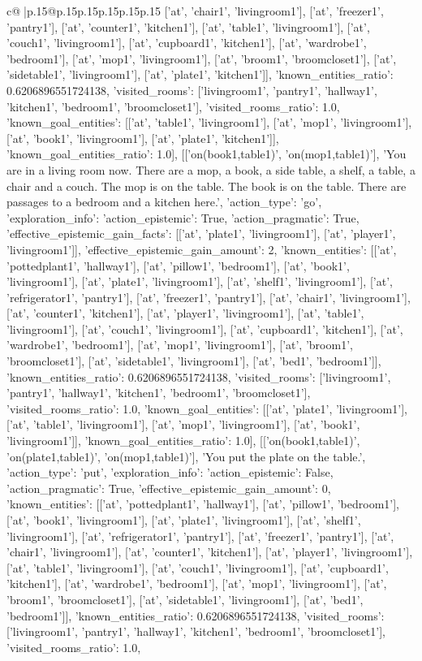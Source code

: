 \documentclass{article}
\begin{document}
{\begin{supertabular}{c@{$\;$}|p{.15\linewidth}@{}p{.15\linewidth}p{.15\linewidth}p{.15\linewidth}p{.15\linewidth}p{.15\linewidth}}
{{{['at', 'chair1', 'livingroom1'], ['at', 'freezer1', 'pantry1'], ['at', 'counter1', 'kitchen1'], ['at', 'table1', 'livingroom1'], ['at', 'couch1', 'livingroom1'], ['at', 'cupboard1', 'kitchen1'], ['at', 'wardrobe1', 'bedroom1'], ['at', 'mop1', 'livingroom1'], ['at', 'broom1', 'broomcloset1'], ['at', 'sidetable1', 'livingroom1'], ['at', 'plate1', 'kitchen1']], 'known_entities_ratio': 0.6206896551724138, 'visited_rooms': ['livingroom1', 'pantry1', 'hallway1', 'kitchen1', 'bedroom1', 'broomcloset1'], 'visited_rooms_ratio': 1.0, 'known_goal_entities': [['at', 'table1', 'livingroom1'], ['at', 'mop1', 'livingroom1'], ['at', 'book1', 'livingroom1'], ['at', 'plate1', 'kitchen1']], 'known_goal_entities_ratio': 1.0}}], [['on(book1,table1)', 'on(mop1,table1)'], 'You are in a living room now. There are a mop, a book, a side table, a shelf, a table, a chair and a couch. The mop is on the table. The book is on the table. There are passages to a bedroom and a kitchen here.', {'action_type': 'go', 'exploration_info': {'action_epistemic': True, 'action_pragmatic': True, 'effective_epistemic_gain_facts': [['at', 'plate1', 'livingroom1'], ['at', 'player1', 'livingroom1']], 'effective_epistemic_gain_amount': 2, 'known_entities': [['at', 'pottedplant1', 'hallway1'], ['at', 'pillow1', 'bedroom1'], ['at', 'book1', 'livingroom1'], ['at', 'plate1', 'livingroom1'], ['at', 'shelf1', 'livingroom1'], ['at', 'refrigerator1', 'pantry1'], ['at', 'freezer1', 'pantry1'], ['at', 'chair1', 'livingroom1'], ['at', 'counter1', 'kitchen1'], ['at', 'player1', 'livingroom1'], ['at', 'table1', 'livingroom1'], ['at', 'couch1', 'livingroom1'], ['at', 'cupboard1', 'kitchen1'], ['at', 'wardrobe1', 'bedroom1'], ['at', 'mop1', 'livingroom1'], ['at', 'broom1', 'broomcloset1'], ['at', 'sidetable1', 'livingroom1'], ['at', 'bed1', 'bedroom1']], 'known_entities_ratio': 0.6206896551724138, 'visited_rooms': ['livingroom1', 'pantry1', 'hallway1', 'kitchen1', 'bedroom1', 'broomcloset1'], 'visited_rooms_ratio': 1.0, 'known_goal_entities': [['at', 'plate1', 'livingroom1'], ['at', 'table1', 'livingroom1'], ['at', 'mop1', 'livingroom1'], ['at', 'book1', 'livingroom1']], 'known_goal_entities_ratio': 1.0}}], [['on(book1,table1)', 'on(plate1,table1)', 'on(mop1,table1)'], 'You put the plate on the table.', {'action_type': 'put', 'exploration_info': {'action_epistemic': False, 'action_pragmatic': True, 'effective_epistemic_gain_amount': 0, 'known_entities': [['at', 'pottedplant1', 'hallway1'], ['at', 'pillow1', 'bedroom1'], ['at', 'book1', 'livingroom1'], ['at', 'plate1', 'livingroom1'], ['at', 'shelf1', 'livingroom1'], ['at', 'refrigerator1', 'pantry1'], ['at', 'freezer1', 'pantry1'], ['at', 'chair1', 'livingroom1'], ['at', 'counter1', 'kitchen1'], ['at', 'player1', 'livingroom1'], ['at', 'table1', 'livingroom1'], ['at', 'couch1', 'livingroom1'], ['at', 'cupboard1', 'kitchen1'], ['at', 'wardrobe1', 'bedroom1'], ['at', 'mop1', 'livingroom1'], ['at', 'broom1', 'broomcloset1'], ['at', 'sidetable1', 'livingroom1'], ['at', 'bed1', 'bedroom1']], 'known_entities_ratio': 0.6206896551724138, 'visited_rooms': ['livingroom1', 'pantry1', 'hallway1', 'kitchen1', 'bedroom1', 'broomcloset1'], 'visited_rooms_ratio': 1.0, }}}
\end{supertabular}}
\end{document}
